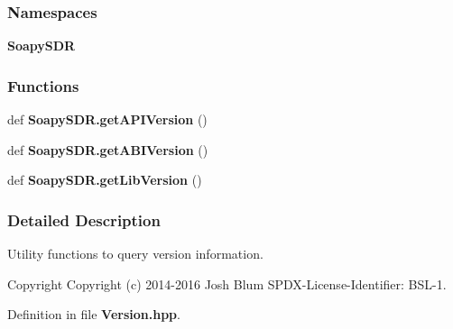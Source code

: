 \subsubsection*{Namespaces}
\begin{DoxyCompactItemize}
\item 
 {\bf Soapy\+S\+DR}
\end{DoxyCompactItemize}
\subsubsection*{Functions}
\begin{DoxyCompactItemize}
\item 
def {\bf Soapy\+S\+D\+R.\+get\+A\+P\+I\+Version} ()
\item 
def {\bf Soapy\+S\+D\+R.\+get\+A\+B\+I\+Version} ()
\item 
def {\bf Soapy\+S\+D\+R.\+get\+Lib\+Version} ()
\end{DoxyCompactItemize}


\subsubsection{Detailed Description}
Utility functions to query version information. 

\begin{DoxyCopyright}{Copyright}
Copyright (c) 2014-\/2016 Josh Blum S\+P\+D\+X-\/\+License-\/\+Identifier\+: B\+S\+L-\/1. 
\end{DoxyCopyright}


Definition in file {\bf Version.\+hpp}.

